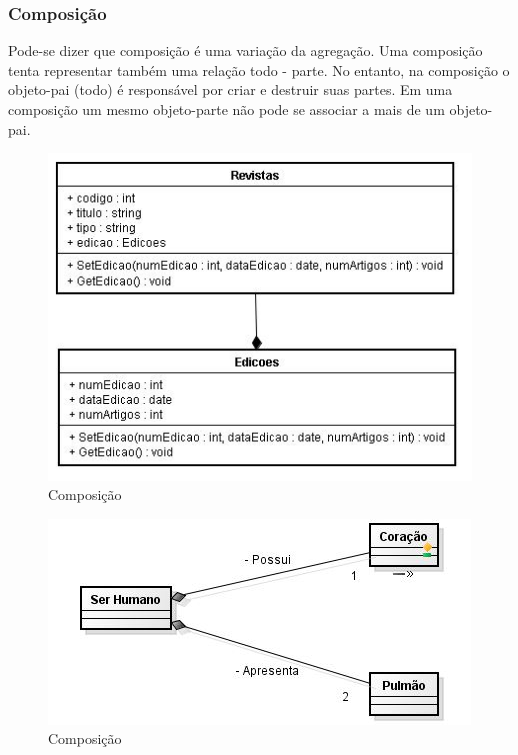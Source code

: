 \subsubsection{Composição}

Pode-se dizer que composição é uma variação da agregação. Uma composição tenta representar também uma relação todo - parte. No entanto, na composição o objeto-pai (todo) é responsável por criar e destruir suas partes. Em uma composição um mesmo objeto-parte não pode se associar a mais de um objeto-pai.

\begin{figure}[H]
	\centering
	\includegraphics[scale=0.8]{imagens/DC_Composicao.jpg}
	\caption{Composição}
	\label{fig:composicao1}
\end{figure}

\begin{figure}[H]
	\centering
	\includegraphics[scale=0.8]{imagens/8.JPG}
	\caption{Composição}
	\label{fig:composicao2}
\end{figure}

